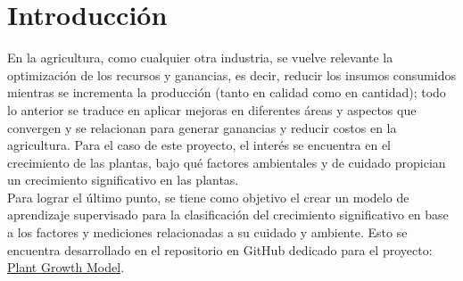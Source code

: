 \documentclass[12pt,a4paper]{article}
\begin{document}
    \tableofcontents
    \newpage

    \section{Introducción}
    {
        En la agricultura, como cualquier otra industria, se vuelve relevante la 
        optimización de los recursos y ganancias, es decir, reducir los insumos 
        consumidos mientras se incrementa la producción (tanto en calidad como en 
        cantidad); todo lo anterior se traduce en aplicar mejoras en diferentes 
        áreas y aspectos que convergen y se relacionan para generar ganancias y 
        reducir costos en la agricultura. Para el caso de este proyecto, el interés 
        se encuentra en el crecimiento de las plantas, bajo qué factores ambientales 
        y de cuidado propician un crecimiento significativo en las plantas.\\ 

        Para lograr el último punto, se tiene como objetivo el crear un modelo de 
        aprendizaje supervisado para la clasificación del crecimiento significativo 
        en base a los factores y mediciones relacionadas a su cuidado y ambiente. 
        Esto se encuentra desarrollado en el repositorio en GitHub dedicado para 
        el proyecto: \href{https://github.com/alexisuaguilaru/Plant_Growth_Model}{Plant Growth Model}.\\
    }
    \newpage
\end{document}
